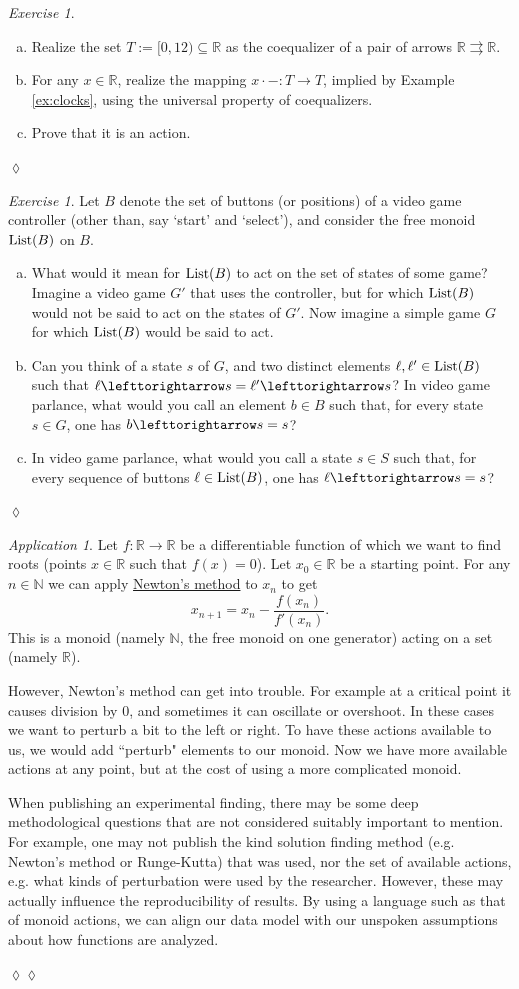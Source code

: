 \documentclass{book}
\def\tn{\textnormal}
\def\RR{{\mathbb R}}
\def\NN{{\mathbb N}}
\def\List{\tn{List}}
\def\to{\rightarrow}
\def\taking{\colon}
\def\tto{\rightrightarrows}
\def\ss{\subseteq}
\def\acts{\lefttorightarrow}
\theoremstyle{remark}
\newtheorem{exc}[subsubsection]{Exercise}
\newenvironment{exercise}{\begin{exc}}{\hspace*{\fill}$\lozenge$\end{exc}}
\newtheorem{app}[subsubsection]{Application}
\newenvironment{application}{\begin{app}}{\hspace*{\fill}$\lozenge\lozenge$\end{app}}
\theoremstyle{definition}
\def\sexc{\begin{enumerate}[a.)]\setlength{\itemsep}{.1cm}\setlength{\parskip}{.1cm}\item}
\def\next{\item}
\def\endsexc{\end{enumerate}}
\begin{document}
\begin{exercise}\label{exc:clock}~
\sexc Realize the set $T:=[0,12)\ss\RR$ as the coequalizer of a pair of arrows $\RR\tto\RR$. 
\next For any $x\in\RR$, realize the mapping $x\cdot-\taking T\to T$, implied by Example \ref{ex:clocks}, using the universal property of coequalizers. 
\next Prove that it is an action.
\endsexc
\end{exercise}

\begin{exercise}
Let $B$ denote the set of buttons (or positions) of a video game controller (other than, say `start' and `select'), and consider the free monoid $\List(B)$ on $B$. 
\sexc What would it mean for $\List(B)$ to act on the set of states of some game? Imagine a video game $G'$ that uses the controller, but for which $\List(B)$ would not be said to act on the states of $G'$. Now imagine a simple game $G$ for which $\List(B)$ would be said to act.
\next Can you think of a state $s$ of $G$, and two distinct elements $\ell,\ell'\in\List(B)$ such that $\ell\acts s=\ell'\acts s$? In video game parlance, what would you call an element $b\in B$ such that, for every state $s\in G$, one has $b\acts s=s$? 
\next In video game parlance, what would you call a state $s\in S$ such that, for every sequence of buttons $\ell\in\List(B)$, one has $\ell\acts s=s$?
\endsexc
\end{exercise}

\begin{application}

Let $f\taking\RR\to\RR$ be a differentiable function of which we want to find roots (points $x\in\RR$ such that $f(x)=0$). Let $x_0\in\RR$ be a starting point. For any $n\in\NN$ we can apply \href{http://en.wikipedia.org/wiki/Newton's_method}{\text Newton's method} to $x_n$ to get $$x_{n+1}=x_n-\frac{f(x_n)}{f'(x_n)}.$$ 
This is a monoid (namely $\NN$, the free monoid on one generator) acting on a set (namely $\RR$). 

However, Newton's method can get into trouble. For example at a critical point it causes division by 0, and sometimes it can oscillate or overshoot. In these cases we want to perturb a bit to the left or right. To have these actions available to us, we would add ``perturb" elements to our monoid. Now we have more available actions at any point, but at the cost of using a more complicated monoid.

When publishing an experimental finding, there may be some deep methodological questions that are not considered suitably important to mention. For example, one may not publish the kind solution finding method (e.g. Newton's method or Runge-Kutta) that was used, nor the set of available actions, e.g. what kinds of perturbation were used by the researcher. However, these may actually influence the reproducibility of results. By using a language such as that of monoid actions, we can align our data model with our unspoken assumptions about how functions are analyzed.

\end{application}
\end{document}
